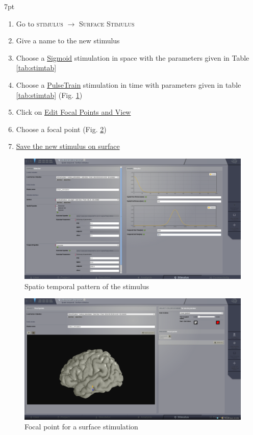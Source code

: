 \documentclass{tufte-handout}
\newenvironment{formal}{%
  \def\FrameCommand{%
    \hspace{1pt}%
    {\color{DarkBlue}\vrule width 2pt}%
    {\color{formalshade}\vrule width 4pt}%
    \colorbox{formalshade}%
  }%
  \MakeFramed{\advance\hsize-\width\FrameRestore}%
  \noindent\hspace{-4.55pt}%
  \begin{adjustwidth}{}{7pt}%
  \vspace{2pt}\vspace{2pt}%
}
{%
  \vspace{2pt}\end{adjustwidth}\endMakeFramed%
}
\begin{document}
  \begin{formal}
  \begin{enumerate}
  \item Go to \textsc{stimulus} $\rightarrow$ \textsc{Surface Stimulus}
  \item Give a name to the new stimulus
  \item Choose a \underline{Sigmoid} stimulation in space with the parameters given in Table \ref{tab:stimtab}
  \item Choose a \underline{PulseTrain} stimulation in time with parameters given in table \ref{tab:stimtab} (Fig. \ref{fig:stim_st})
  \item Click on \underline{Edit Focal Points and View}
  \item Choose a focal point (Fig. \ref{fig:stim_foc})
  \item \underline{Save the new stimulus on surface}
  \end{enumerate}
\end{formal}


\begin{figure}[h]
  \includegraphics[width=\linewidth]{Handout_UI_ModellingAnEpilepticPatient_StimulationSpatioTemporalPattern}%
  \caption{Spatio temporal pattern of the stimulus}%
  \label{fig:stim_st}%
\end{figure}

\begin{figure}[h]
  \includegraphics[width=\linewidth]{Handout_UI_ModellingAnEpilepticPatient_StimulationFocalPoint}%
  \caption{Focal point for a surface stimulation}%
  \label{fig:stim_foc}%
\end{figure}
\end{document}
